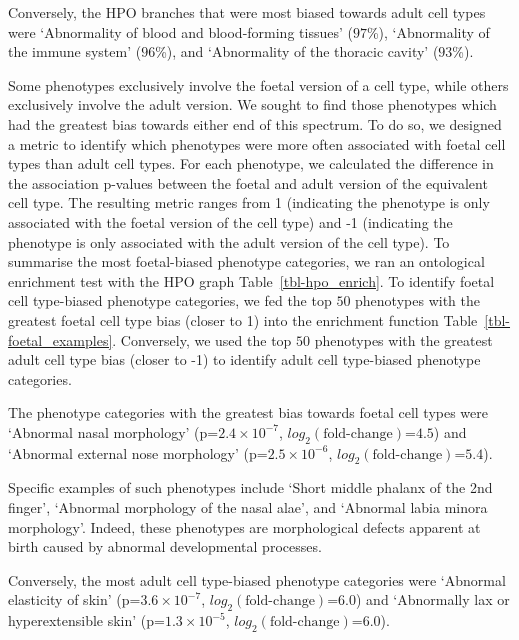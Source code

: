 \documentclass[
]{article}
\begin{document}
Conversely, the HPO branches that were most biased towards adult cell
types were `Abnormality of blood and blood-forming tissues' (\(97\)\%),
`Abnormality of the immune system' (\(96\)\%), and `Abnormality of the
thoracic cavity' (\(93\)\%).

Some phenotypes exclusively involve the foetal version of a cell type,
while others exclusively involve the adult version. We sought to find
those phenotypes which had the greatest bias towards either end of this
spectrum. To do so, we designed a metric to identify which phenotypes
were more often associated with foetal cell types than adult cell types.
For each phenotype, we calculated the difference in the association
p-values between the foetal and adult version of the equivalent cell
type. The resulting metric ranges from 1 (indicating the phenotype is
only associated with the foetal version of the cell type) and -1
(indicating the phenotype is only associated with the adult version of
the cell type). To summarise the most foetal-biased phenotype
categories, we ran an ontological enrichment test with the HPO graph
Table~\ref{tbl-hpo_enrich}. To identify foetal cell type-biased
phenotype categories, we fed the top \(50\) phenotypes with the greatest
foetal cell type bias (closer to 1) into the enrichment function
Table~\ref{tbl-foetal_examples}. Conversely, we used the top \(50\)
phenotypes with the greatest adult cell type bias (closer to -1) to
identify adult cell type-biased phenotype categories.

The phenotype categories with the greatest bias towards foetal cell
types were `Abnormal nasal morphology' (p=\(2.4 \times 10^{-7}\),
\(log_2(\text{fold-change})\)=\(4.5\)) and `Abnormal external nose
morphology' (p=\(2.5 \times 10^{-6}\),
\(log_2(\text{fold-change})\)=\(5.4\)).

Specific examples of such phenotypes include `Short middle phalanx of
the 2nd finger', `Abnormal morphology of the nasal alae', and `Abnormal
labia minora morphology'. Indeed, these phenotypes are morphological
defects apparent at birth caused by abnormal developmental processes.

Conversely, the most adult cell type-biased phenotype categories were
`Abnormal elasticity of skin' (p=\(3.6 \times 10^{-7}\),
\(log_2(\text{fold-change})\)=\(6.0\)) and `Abnormally lax or
hyperextensible skin' (p=\(1.3 \times 10^{-5}\),
\(log_2(\text{fold-change})\)=\(6.0\)).
\end{document}
